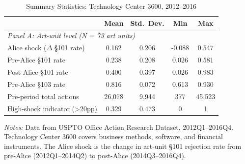 \begin{table}[H]
\centering
\caption{Summary Statistics: Technology Center 3600, 2012--2016}
\label{tab:summary}
\begin{threeparttable}
\begin{tabular}{lcccc}
\toprule
 & Mean & Std.\ Dev. & Min & Max \\
\midrule
\multicolumn{5}{l}{\textit{Panel A: Art-unit level (N = 73 art units)}} \\
  Alice shock ($\Delta$ \S101 rate) & 0.162 & 0.206 & -0.088 & 0.547 \\
  Pre-Alice \S101 rate & 0.238 & 0.208 & 0.026 & 0.581 \\
  Post-Alice \S101 rate & 0.400 & 0.397 & 0.026 & 0.983 \\
  Pre-Alice \S103 rate & 0.816 & 0.072 & 0.613 & 0.930 \\
  Pre-period total actions & 26,078 & 9,944 & 377 & 45,523 \\
  High-shock indicator (>20pp) & 0.329 & 0.473 & 0 & 1 \\
\bottomrule
\end{tabular}
\begin{tablenotes}[flushleft]
\small
\item \textit{Notes:} Data from USPTO Office Action Research Dataset, 2012Q1--2016Q4. Technology Center 3600 covers business methods, software, and financial instruments. The Alice shock is the change in art-unit \S101 rejection rate from pre-Alice (2012Q1--2014Q2) to post-Alice (2014Q3--2016Q4).
\end{tablenotes}
\end{threeparttable}
\end{table}
